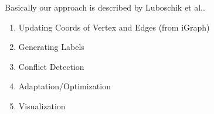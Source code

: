 Basically our approach is described by Luboschik et al.\cite{RN38}.

\begin{enumerate}
    \item Updating Coords of Vertex and Edges (from iGraph)
    \item Generating Labels
    \item Conflict Detection
    \item Adaptation/Optimization
    \item Visualization
\end{enumerate}